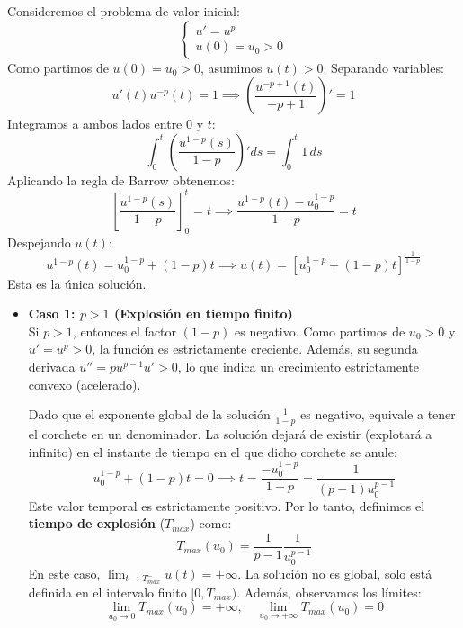 Consideremos el problema de valor inicial:
\[
    \begin{cases}
        u' = u^p \\
        u(0) = u_0 > 0
    \end{cases}
\]
Como partimos de $u(0) = u_0 > 0$, asumimos $u(t) > 0$. Separando variables:
\[
    u'(t) u^{-p}(t) = 1 \implies \left( \frac{u^{-p+1}(t)}{-p+1} \right)' = 1
\]
Integramos a ambos lados entre $0$ y $t$:
\[
    \int_0^t \left( \frac{u^{1-p}(s)}{1-p} \right)' ds = \int_0^t 1 \, ds
\]
Aplicando la regla de Barrow obtenemos:
\[
    \left[ \frac{u^{1-p}(s)}{1-p} \right]_0^t = t \implies \frac{u^{1-p}(t) - u_0^{1-p}}{1-p} = t
\]
Despejando $u(t)$:
\[
    u^{1-p}(t) = u_0^{1-p} + (1-p)t \implies u(t) = \left[ u_0^{1-p} + (1-p)t \right]^{\frac{1}{1-p}}
\]
Esta es la única solución.
\begin{itemize}
    \item \textbf{Caso 1: $p > 1$ (Explosión en tiempo finito)} \\
    Si $p > 1$, entonces el factor $(1-p)$ es negativo. Como partimos de $u_0 > 0$ y $u' = u^p > 0$, la función es estrictamente creciente. Además, su segunda derivada $u'' = p u^{p-1} u' > 0$, lo que indica un crecimiento estrictamente convexo (acelerado).
    
    Dado que el exponente global de la solución $\frac{1}{1-p}$ es negativo, equivale a tener el corchete en un denominador. La solución dejará de existir (explotará a infinito) en el instante de tiempo en el que dicho corchete se anule:
    $$ u_0^{1-p} + (1-p)t = 0 \implies t = \frac{-u_0^{1-p}}{1-p} = \frac{1}{(p-1)u_0^{p-1}} $$
    Este valor temporal es estrictamente positivo. Por lo tanto, definimos el \textbf{tiempo de explosión} ($T_{max}$) como:
    $$ T_{max}(u_0) = \frac{1}{p-1} \frac{1}{u_0^{p-1}} $$
    En este caso, $\lim_{t \to T_{max}^-} u(t) = +\infty$. La solución no es global, solo está definida en el intervalo finito $[0, T_{max})$.
    Además, observamos los límites:
    \[
        \lim_{u_0 \to 0} T_{max}(u_0) = +\infty, \quad \lim_{u_0 \to +\infty} T_{max}(u_0) = 0
    \]

    \begin{center}
    \end{center}


\end{itemize}
